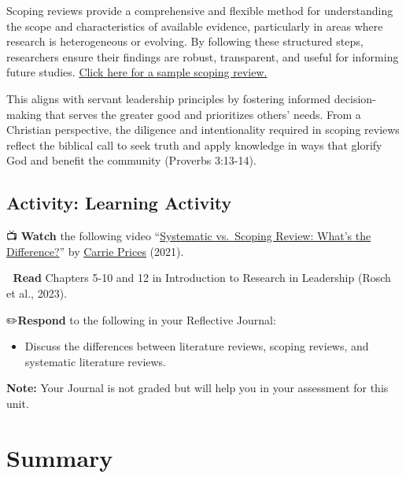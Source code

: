 \documentclass[
  letterpaper,
  DIV=11,
  numbers=noendperiod]{scrreprt}
\providecommand{\tightlist}{%
  \setlength{\itemsep}{0pt}\setlength{\parskip}{0pt}}\usepackage{longtable,booktabs,array}
\begin{document}
Scoping reviews provide a comprehensive and flexible method for
understanding the scope and characteristics of available evidence,
particularly in areas where research is heterogeneous or evolving. By
following these structured steps, researchers ensure their findings are
robust, transparent, and useful for informing future studies.
\href{https://mytwu-my.sharepoint.com/personal/jodi_mcbride_twu_ca/Documents/Documents/591\%20Curriculum\%20Revision/Articles/TESOL\%20Journal\%20-\%202025\%20-\%20Reinders\%20-\%20Conceptualizations\%20of\%20and\%20Research\%20on\%20Language\%20Teacher\%20Leadership\%20\%20A\%20Scoping\%20Review.pdf}{Click
here for a sample scoping review.}

This aligns with servant leadership principles by fostering informed
decision-making that serves the greater good and prioritizes others'
needs. From a Christian perspective, the diligence and intentionality
required in scoping reviews reflect the biblical call to seek truth and
apply knowledge in ways that glorify God and benefit the community
(Proverbs 3:13-14).

\subsection*{Activity: Learning
Activity}\label{activity-learning-activity-4}

📺 \textbf{Watch} the following video
``\href{https://www.youtube.com/watch?app=desktop&si=jyp8a-827EYUC2HA&v=YVckIl8_ZCg&feature=youtu.be}{Systematic
vs.~Scoping Review: What's the Difference?}'' by
\href{https://www.youtube.com/@carrieprice78}{Carrie Prices} (2021).

📖 \textbf{Read} Chapters 5-10 and 12 in Introduction to Research in
Leadership (Rosch et al., 2023).

✏️\textbf{Respond} to the following in your Reflective Journal:

\begin{itemize}
\tightlist
\item
  Discuss the differences between literature reviews, scoping reviews,
  and systematic literature reviews.
\end{itemize}

\textbf{Note:} Your Journal is not graded but will help you in your
assessment for this unit.

\section*{Summary}\label{summary-1}
\end{document}
